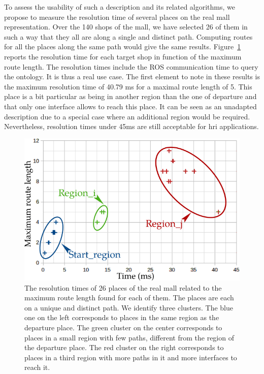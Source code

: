 To assess the usability of such a description and its related algorithms, we propose to measure the resolution time of several places on the real mall representation. Over the 140 shops of the mall, we have selected 26 of them in such a way that they all are along a single and distinct path. Computing routes for all the places along the same path would give the same results. Figure~\ref{fig:chap3_performance} reports the resolution time for each target shop in function of the maximum route length. The resolution times include the ROS communication time to query the ontology. It is thus a real use case. The first element to note in these results is the maximum resolution time of 40.79 ms for a maximal route length of 5. This place is a bit particular as being in another region than the one of departure and that only one interface allows to reach this place. It can be seen as an unadapted description due to a special case where an additional region would be required. Nevertheless, resolution times under 45ms are still acceptable for \acrshort{hri} applications.

\begin{figure}[ht!]
\centering
\includegraphics[scale=0.6]{figures/chapter3/performance.png}
\caption{\label{fig:chap3_performance} The resolution times of 26 places of the real mall related to the maximum route length found for each of them. The places are each on a unique and distinct path. We identify three clusters. The blue one on the left corresponds to places in the same region as the departure place. The green cluster on the center corresponds to places in a small region with few paths, different from the region of the departure place. The red cluster on the right corresponds to places in a third region with more paths in it and more interfaces to reach it. }
\end{figure}


